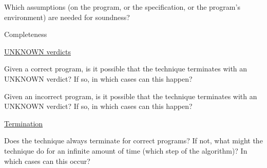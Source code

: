 \documentclass[a4paper]{article}
\begin{document}
\begin{landscape}
\begin{minipage}[t]{0.2\linewidth}
\begin{betterlist}
\begin{betterlist}
\begin{betterlist}
			\end{betterlist}
			\item Which assumptions (on the program, or the specification, or the program’s environment) are needed for soundness?
		\end{betterlist}
		\item \alert{Completeness}
		\begin{betterlist}
			\item \underline{UNKNOWN verdicts}
			\begin{betterlist}
				\item Given a correct program, is it possible that the technique terminates with an UNKNOWN verdict? If so, in which cases can this happen?

				\item Given an incorrect program, is it possible that the technique terminates with an UNKNOWN verdict? If so, in which cases can this happen?

			\end{betterlist}
			\item \underline{Termination}
			\begin{betterlist}
				\item Does the technique always terminate for correct programs? If not, what might the technique do for an infinite amount of time (which step of the algorithm)? In which cases can this occur?


\end{betterlist}
\end{betterlist}
\end{betterlist}
\end{minipage}
\end{landscape}
\end{document}
